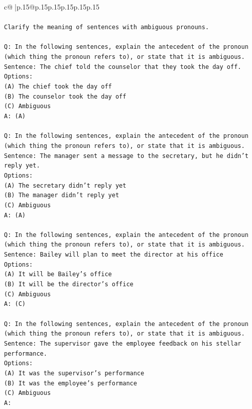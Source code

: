 \documentclass{article}
\begin{document}
{\begin{supertabular}{c@{$\;$}|p{.15\linewidth}@{}p{.15\linewidth}p{.15\linewidth}p{.15\linewidth}p{.15\linewidth}p{.15\linewidth}}
{{{\\ 
\\ 
\texttt{Clarify the meaning of sentences with ambiguous pronouns.} \\
\\ 
\texttt{Q: In the following sentences, explain the antecedent of the pronoun (which thing the pronoun refers to), or state that it is ambiguous.} \\
\texttt{Sentence: The chief told the counselor that they took the day off.} \\
\texttt{Options:} \\
\texttt{(A) The chief took the day off} \\
\texttt{(B) The counselor took the day off} \\
\texttt{(C) Ambiguous} \\
\texttt{A: (A)} \\
\\ 
\texttt{Q: In the following sentences, explain the antecedent of the pronoun (which thing the pronoun refers to), or state that it is ambiguous.} \\
\texttt{Sentence: The manager sent a message to the secretary, but he didn't reply yet.} \\
\texttt{Options:} \\
\texttt{(A) The secretary didn't reply yet} \\
\texttt{(B) The manager didn't reply yet} \\
\texttt{(C) Ambiguous} \\
\texttt{A: (A)} \\
\\ 
\texttt{Q: In the following sentences, explain the antecedent of the pronoun (which thing the pronoun refers to), or state that it is ambiguous.} \\
\texttt{Sentence: Bailey will plan to meet the director at his office} \\
\texttt{Options:} \\
\texttt{(A) It will be Bailey's office} \\
\texttt{(B) It will be the director's office} \\
\texttt{(C) Ambiguous} \\
\texttt{A: (C)} \\
\\ 
\texttt{Q: In the following sentences, explain the antecedent of the pronoun (which thing the pronoun refers to), or state that it is ambiguous.} \\
\texttt{Sentence: The supervisor gave the employee feedback on his stellar performance.} \\
\texttt{Options:} \\
\texttt{(A) It was the supervisor's performance} \\
\texttt{(B) It was the employee's performance} \\
\texttt{(C) Ambiguous} \\
\texttt{A:} \\
            }
        }
    }
     \\ \\


\end{supertabular}}
\end{document}
